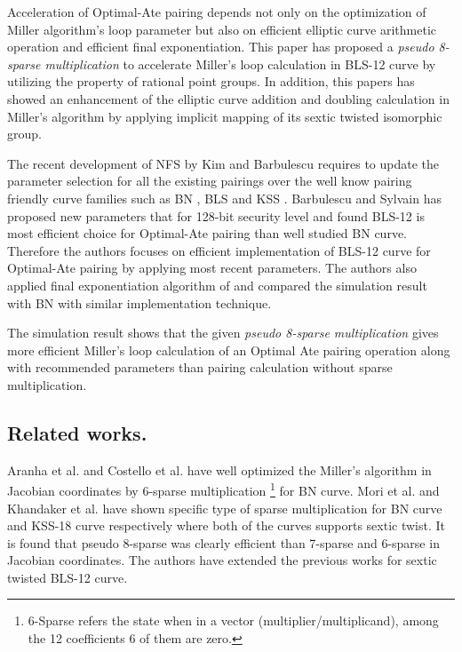 Acceleration of Optimal-Ate pairing depends not only on the optimization of Miller algorithm's loop parameter but also on efficient elliptic curve arithmetic operation and efficient final exponentiation.  
This paper has proposed a \textit{pseudo 8-sparse multiplication} to accelerate Miller's loop calculation in BLS-12 curve by utilizing the property of  rational point groups.
In addition, this papers has showed an enhancement of the elliptic curve addition and doubling calculation in Miller's algorithm by applying implicit mapping of its sextic twisted isomorphic group. 

The recent development of NFS by Kim and Barbulescu \cite{C:KimBar16} requires to update the parameter selection for all the existing pairings over the well know pairing friendly curve families such as BN \cite{SAC:BarNae05}, BLS \cite{SCN:BarLynSco02} and KSS \cite{EPRINT:KacSchSco07}.
Barbulescu and Sylvain \cite{sylvain_new_param} has proposed new parameters that for 128-bit security level and found BLS-12 is most efficient choice for Optimal-Ate pairing than well studied BN curve. Therefore the authors focuses on efficient implementation of BLS-12 curve for Optimal-Ate pairing by applying most recent parameters. 
The authors also applied final exponentiation algorithm of \cite{EPRINT:GhaFou16a} and compared the simulation result with BN with similar implementation technique.

The simulation result shows that the given \textit{pseudo 8-sparse multiplication} gives more efficient Miller's loop calculation of an Optimal Ate pairing operation along with recommended parameters than pairing calculation without sparse multiplication.

\subsection*{Related works.}
Aranha et al. \cite[Section 4]{EC:AKLGL11} and Costello et al. \cite{PKC:CosLanNae10} have  well optimized the Miller's algorithm in Jacobian coordinates by 6-sparse multiplication \footnote{\label{6sparse}{6-Sparse refers the state when in a vector (multiplier/multiplicand), among the 12 coefficients 6 of them are zero.}} for BN curve. 
Mori et al. \cite{PAIRING:MANS13} and Khandaker et al. \cite{ICISC:KONSD16} have shown  specific type of sparse multiplication for BN curve and KSS-18 curve respectively where both of the curves supports sextic twist.
It is found that pseudo 8-sparse was clearly efficient than 7-sparse and 6-sparse in Jacobian coordinates.
The authors have extended the previous works for sextic twisted BLS-12 curve.


